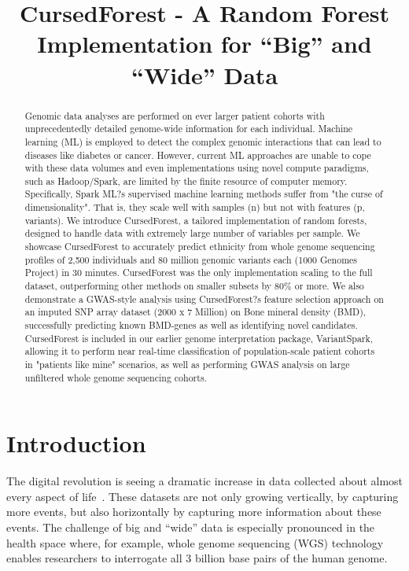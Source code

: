 \documentclass[a4paper]{amsart}
\title{CursedForest - A Random Forest Implementation for ``Big'' and ``Wide'' Data}
\begin{document}
  
\maketitle

\begin{abstract}
Genomic data analyses are performed on ever larger patient cohorts with unprecedentedly detailed genome-wide information for each individual. Machine learning (ML) is employed to detect the complex genomic interactions that can lead to diseases like diabetes or cancer. 
However, current ML approaches are unable to cope with these data volumes and even implementations using novel compute paradigms, such as Hadoop/Spark, are limited by the finite resource of computer memory. Specifically, Spark ML?s supervised machine learning methods suffer from "the curse of dimensionality". That is, they scale well with samples (n) but not with features (p, variants). 
We introduce CursedForest, a tailored implementation of random forests, designed to handle data with extremely large number of variables per sample. We showcase CursedForest to accurately predict ethnicity from whole genome sequencing profiles of 2,500 individuals and 80 million genomic variants each (1000 Genomes Project) in 30 minutes. CursedForest was the only implementation scaling to the full dataset, outperforming other methods on smaller subsets by 80\% or more. We also demonstrate a GWAS-style analysis using CursedForest?s feature selection approach on an imputed SNP array dataset (2000 x 7 Million) on Bone mineral density (BMD), successfully predicting known BMD-genes as well as identifying novel candidates. 
CursedForest is included in our earlier genome interpretation package, VariantSpark, allowing it to perform near real-time classification of population-scale patient cohorts in "patients like mine" scenarios, as well as performing GWAS analysis on large unfiltered whole genome sequencing cohorts. 
\end{abstract}



\section{Introduction}
The digital revolution is seeing a dramatic increase in data collected about almost every aspect of
life~\cite{Loebbecke2015}.  These datasets are not only growing vertically, by capturing more events, but also
horizontally by capturing more information about these events.  The challenge of big and ``wide'' data is especially
pronounced in the health space where, for example, whole genome sequencing (WGS) technology enables researchers to
interrogate all 3 billion base pairs of the human genome.
\end{document}
